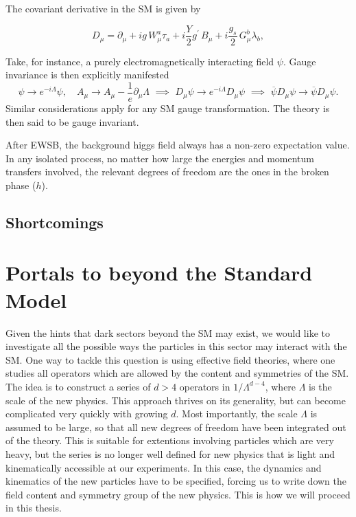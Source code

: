 The covariant derivative in the SM is given by

\begin{equation}
 D_\mu = \partial_\mu + ig \,W_\mu^a\tau_a + i\frac{Y}{2} g^\prime \,B_\mu + i\frac{g_s}{2} \,G_\mu^b\lambda_b,
\end{equation}

Take, for instance, a purely electromagnetically interacting field $\psi$. Gauge invariance is then explicitly manifested
\[\psi \to e^{-i\Lambda} \psi, \quad A_\mu \to A_\mu - \frac{1}{e}\partial_\mu \Lambda \,\,\implies\,\, D_\mu \psi \to e^{-i\Lambda}D_\mu\psi \,\,\implies \,\, \overline{\psi} D_\mu \psi \to \overline{\psi} D_\mu \psi. \]
Similar considerations apply for any SM gauge transformation. The theory is then said to be gauge invariant.

After EWSB, the background higgs field always has a non-zero expectation value. In any isolated process, no matter how large the energies and momentum transfers involved, the relevant degrees of freedom are the ones in the broken phase (\ie $h$). 

\subsection{Shortcomings}

\section{Portals to beyond the Standard Model}

Given the hints that dark sectors beyond the SM may exist, we would like to investigate all the possible ways the particles in this sector may interact with the SM. One way to tackle this question is using effective field theories, where one studies all operators which are allowed by the content and symmetries of the SM. The idea is to construct a series of $d>4$ operators in $1/\Lambda^{d-4}$, where $\Lambda$ is the scale of the new physics. This approach thrives on its generality, but can become complicated very quickly with growing $d$. Most importantly, the scale $\Lambda$ is assumed to be large, so that all new degrees of freedom have been integrated out of the theory. This is suitable for extentions involving particles which are very heavy, but the series is no longer well defined for new physics that is light and kinematically accessible at our experiments. In this case, the dynamics and kinematics of the new particles have to be specified, forcing us to write down the field content and symmetry group of the new physics. This is how we will proceed in this thesis.

